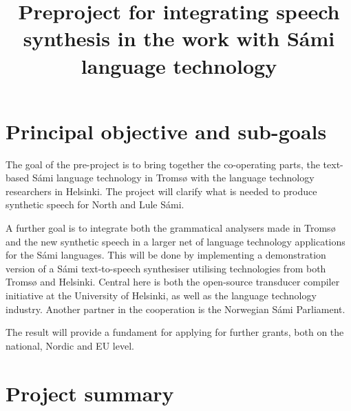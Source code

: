 \documentclass[a4paper,english]{article}
\begin{document}
\title{Preproject for integrating speech synthesis in the work with Sámi language technology}


\maketitle

\tableofcontents





\section{Principal objective and sub-goals}

The goal of the pre-project is to bring together the co-operating parts, the text-based Sámi language technology in Tromsø with the language technology researchers in Helsinki. The project will clarify what is needed to produce synthetic speech for North and Lule Sámi.  

A further goal is to integrate both the grammatical analysers made in Tromsø and the new synthetic speech in a larger net of language technology applications for the Sámi languages.  This will be done by implementing a demonstration version of a Sámi text-to-speech synthesiser utilising technologies from both Tromsø and Helsinki. Central here is both the open-source transducer compiler initiative at the University of Helsinki, as well as the language technology industry. Another partner in the cooperation is the Norwegian Sámi Parliament.

The result will provide a fundament for applying for further grants, both on the national, Nordic and EU level.

\section{Project summary} %
\end{document}
